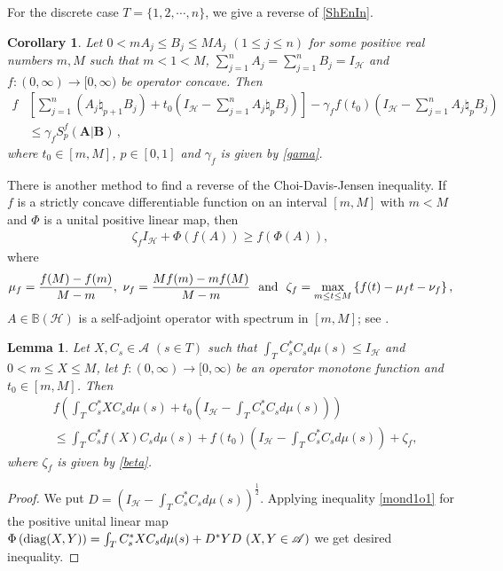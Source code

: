 \documentclass[12pt, reqno]{amsart}
\newtheorem{lemma}[theorem]{Lemma}
\newtheorem{corollary}[theorem]{Corollary}
\theoremstyle{definition}
\theoremstyle{remark}
\numberwithin{equation}{section}
\begin{document}
For the discrete case $T=\{1,2,\cdots,n\}$, we give a reverse of \eqref{ShEnIn}.
\begin{corollary}\label{tShEnIn}
Let  $0<m A_j \leq B_j \leq M A_j\,\,(1\leq j\leq n)$  for some positive real numbers $m, M$  such that $m<1<M$,  $\sum_{j=1}^nA_j=\sum_{j=1}^nB_j=I_{\mathscr H}$ and $f: (0,\infty) \to [0,\infty)$ be  operator
concave. Then
\begin{align}\label{ShEnInre}
f&\left[\sum_{j=1}^n(A_j\natural_{p+1}B_j)+t_0\left(I_{\mathscr H}-\sum_{j=1}^nA_j\natural_pB_j\right)\right]-\gamma_ff(t_0)\left(I_{\mathscr H}-\sum_{j=1}^nA_j\natural_pB_j\right)\nonumber\\
&\le \gamma_fS_p^f(\mathbf{A}|\mathbf{B})\,,
\end{align}
where $t_0\in[m,M]$, $p\in[0,1]$ and $\gamma_f$ is given by \eqref{gama}.
\end{corollary}
There is another method to find a reverse of the Choi-Davis-Jensen inequality.
If $f$ is a strictly concave differentiable function on an interval $[m,M]$ with $m<M$ and  $\Phi$ is a unital positive linear map, then
\begin{eqnarray}\label{mond1o1}
\zeta_f I_{\mathscr H}+ \Phi(f(A)) \geq f(\Phi(A)),
\end{eqnarray}
where
{\footnotesize\begin{eqnarray}\label{beta}
\mu_f=\frac{f(M)-f(m)}{M-m},\,\, \nu_f=\frac{Mf(m)-mf(M)}{M-m}\,\,{\rm~and~}\,\,\zeta_f=\max_{m\leq t\leq M}\left\{f(t)-\mu_ft-\nu_f\right\},
\end{eqnarray}}
$A \in {\mathbb B}({\mathscr H})$ is a self-adjoint operator with spectrum in $[m,M]$; see \cite[p. 101]{FMPS}.
\begin{lemma}\label{reverses2}
 Let $X,C_s\in\mathscr{A}\,\,(s\in T)$ such that $\int_TC_s^*C_sd\mu(s)\le I_{\mathscr H}$ and $0<m\leq X \leq M$,  let $f:(0,\infty) \to [0,\infty)$ be an operator monotone function and $t_0\in[m,M]$.
 Then
  \begin{align*}
&f\left(\int_TC_s^*XC_sd\mu(s)+t_0\left(I_{\mathscr H}-\int_TC_s^*C_sd\mu(s)\right)\right)\\
&\leq\int_TC_s^*f(X)C_sd\mu(s)+f(t_0)\left(I_{\mathscr H}-\int_TC_s^*C_sd\mu(s)\right)+\zeta_f,
  \end{align*}
     where $\zeta_f$ is given by \eqref{beta}.
\end{lemma}
 \begin{proof}
We put $D=(I_{\mathscr H}-\int_TC_s^*C_sd\mu(s))^\frac{1}{2}$.
 Applying  inequality \eqref{mond1o1} for the positive unital linear map $\Phi\left({\rm diag}(X,Y)\right)=\int_TC_s^*XC_sd\mu(s)+D^*YD\,\,(X,Y\in\mathscr{A})$ we get desired inequality.
\end{proof}
\end{document}
